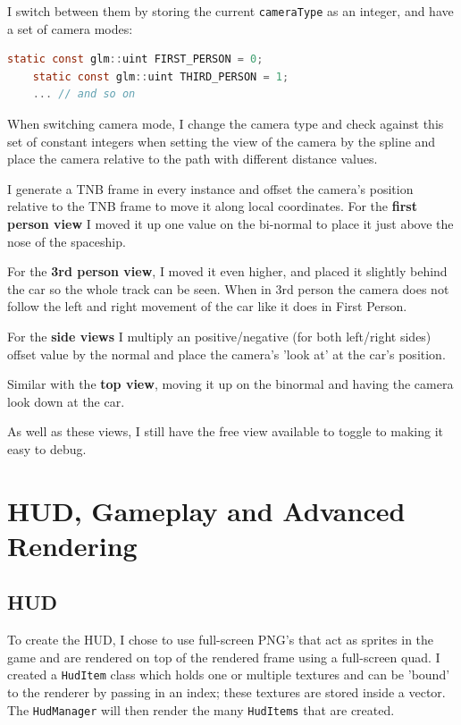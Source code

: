 \documentclass[10pt]{report}
\begin{document}
I switch between them by storing the current \colorbox{mygrey}{\lstinline{cameraType}} as an integer, and have a set of camera modes:
\begin{lstlisting}[language=c]
    static const glm::uint FIRST_PERSON = 0;
    static const glm::uint THIRD_PERSON = 1;
    ... // and so on
\end{lstlisting}
When switching camera mode, I change the camera type and check against this set of constant integers when setting the view of the camera by the spline and place the camera relative to the path with different distance values.

I generate a TNB frame in every instance and offset the camera's position relative to the TNB frame to move it along local coordinates. For the \textbf{first person view} I moved it up one value on the bi-normal to place it just above the nose of the spaceship.

For the \textbf{3rd person view}, I moved it even higher, and placed it slightly behind the car so the whole track can be seen. When in 3rd person the camera does not follow the left and right movement of the car like it does in First Person.

For the \textbf{side views} I multiply an positive/negative (for both left/right sides) offset value by the normal and place the camera's 'look at' at the car's position.

Similar with the \textbf{top view}, moving it up on the binormal and having the camera look down at the car.

As well as these views, I still have the free view available to toggle to making it easy to debug.

\section*{HUD, Gameplay and Advanced Rendering}
\subsection*{HUD}
To create the HUD, I chose to use full-screen PNG's that act as sprites in the game and are rendered on top of the rendered frame using a full-screen quad. I created a \colorbox{mygrey}{\lstinline{HudItem}} class which holds one or multiple textures and can be 'bound' to the renderer by passing in an index; these textures are stored inside a vector. The \colorbox{mygrey}{\lstinline{HudManager}} will then render the many \colorbox{mygrey}{\lstinline{HudItems}} that are created.
\end{document}
